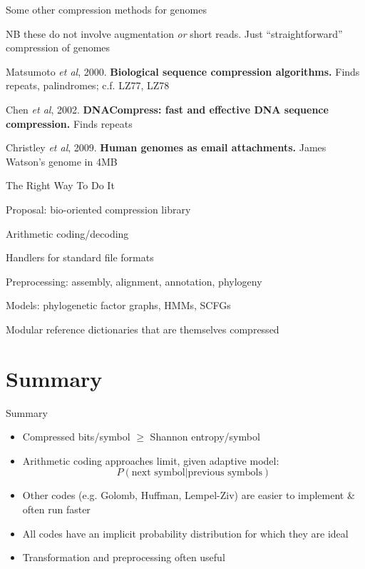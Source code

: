\documentclass{beamer}
\begin{document}
\begin{frame}{Some other compression methods for genomes}

\itemb
\item NB these do not involve augmentation {\em or} short reads. Just ``straightforward'' compression of genomes
\itemb
\item Matsumoto {\em et al}, 2000. {\bf Biological sequence compression algorithms.} \alert{Finds repeats, palindromes; c.f. LZ77, LZ78}
\item Chen {\em et al}, 2002. {\bf DNACompress: fast and effective DNA sequence compression.} \alert{Finds repeats}
\item Christley {\em et al}, 2009. {\bf Human genomes as email attachments.} \alert{James Watson's genome in 4MB}
\iteme
\iteme

\end{frame}

\begin{frame}{The Right Way To Do It}

\itemb
\item Proposal: \alert{bio-oriented compression library}
\itemb
\item Arithmetic coding/decoding
\item Handlers for standard file formats
\item Preprocessing: assembly, alignment, annotation, phylogeny
\item Models: phylogenetic factor graphs, HMMs, SCFGs
\item Modular reference dictionaries that are themselves compressed
\iteme
\iteme

\end{frame}

\section*{Summary}

\begin{frame}{Summary}

  \begin{itemize}
  \item Compressed bits/symbol $\geq$ Shannon entropy/symbol
   \itemb
   \item Arithmetic coding approaches limit, given adaptive model:
\[
P(\mbox{next symbol}|\mbox{previous symbols})
\]
   \item Other codes (e.g. Golomb, Huffman, Lempel-Ziv) are easier to implement \& often run faster
   \item All codes have an implicit probability distribution for which they are ideal
   \iteme
 \item Transformation and preprocessing often useful
 \end{itemize}

\end{frame}
\end{document}
